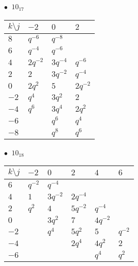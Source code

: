\begin{minipage}{\linewidth}
$\bullet\ $ $10_{17}$ \vspace{0.5em} \\
\begin{tabular}{l|lll}
$k \setminus j$ & $-2$ & $0$ & $2$ \\
\hline
$8$ & $q^{-6}$ & $q^{-8}$ &  \\
$6$ & $q^{-4}$ & $q^{-6}$ &  \\
$4$ & $2q^{-2}$ & $3q^{-4}$ & $q^{-6}$ \\
$2$ & $2$ & $3q^{-2}$ & $q^{-4}$ \\
$0$ & $2q^{2}$ & $5$ & $2q^{-2}$ \\
$-2$ & $q^{4}$ & $3q^{2}$ & $2$ \\
$-4$ & $q^{6}$ & $3q^{4}$ & $2q^{2}$ \\
$-6$ &  & $q^{6}$ & $q^{4}$ \\
$-8$ &  & $q^{8}$ & $q^{6}$ \\
\end{tabular}
\vspace{2em}
\end{minipage}
%
\begin{minipage}{\linewidth}
$\bullet\ $ $10_{18}$ \vspace{0.5em} \\
\begin{tabular}{l|lllll}
$k \setminus j$ & $-2$ & $0$ & $2$ & $4$ & $6$ \\
\hline
$6$ & $q^{-2}$ & $q^{-4}$ &  &  &  \\
$4$ & $1$ & $3q^{-2}$ & $2q^{-4}$ &  &  \\
$2$ & $q^{2}$ & $4$ & $5q^{-2}$ & $q^{-4}$ &  \\
$0$ &  & $3q^{2}$ & $7$ & $4q^{-2}$ &  \\
$-2$ &  & $q^{4}$ & $5q^{2}$ & $5$ & $q^{-2}$ \\
$-4$ &  &  & $2q^{4}$ & $4q^{2}$ & $2$ \\
$-6$ &  &  &  & $q^{4}$ & $q^{2}$ \\
\end{tabular}
\vspace{2em}
\end{minipage}
%
